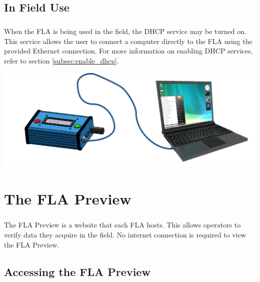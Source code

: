 \documentclass[11pt, oneside]{book}
\begin{document}
\section{In Field Use}\label{setting_fla_in_field}
\paragraph{  }
When the FLA is being used in the field, the DHCP service may be turned on. This service allows the user to connect a computer directly to the FLA using the provided Ethernet connection. For more information on enabling DHCP services, refer to section \ref{subsec:enable_dhcp}.
\begin{center}
\includegraphics[width=.9\linewidth]{../media/graphics/fla_in_field}
\end{center}


\chapter{The FLA Preview}\label{sec:fla_preview}
\paragraph{  }
The FLA Preview is a website that each FLA hosts. This allows operators
to verify data they acquire in the field. No internet connection is required to
view the FLA Preview.


\section{Accessing the FLA Preview}
\end{document}
